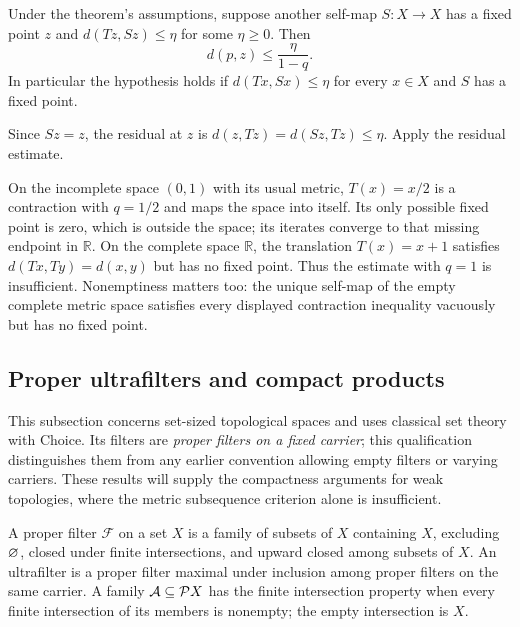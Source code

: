 \begin{corollary}
Under the theorem's assumptions, suppose another self-map $S:X\to X$
has a fixed point $z$ and $d(Tz,Sz)\leq\eta$ for some $\eta\geq0$.
Then
\[
d(p,z)\leq\frac{\eta}{1-q}.
\]
In particular the hypothesis holds if $d(Tx,Sx)\leq\eta$ for every
$x\in X$ and $S$ has a fixed point.
\end{corollary}
\Proof
Since $Sz=z$, the residual at $z$ is
$d(z,Tz)=d(Sz,Tz)\leq\eta$. Apply the residual estimate.
\Done

\begin{example}
On the incomplete space $(0,1)$ with its usual metric, $T(x)=x/2$
is a contraction with $q=1/2$ and maps the space into itself. Its
only possible fixed point is zero, which is outside the space; its
iterates converge to that missing endpoint in $\mathbb R$.
On the complete space $\mathbb R$, the translation $T(x)=x+1$
satisfies $d(Tx,Ty)=d(x,y)$ but has no fixed point. Thus the estimate
with $q=1$ is insufficient. Nonemptiness matters too: the unique
self-map of the empty complete metric space satisfies every displayed
contraction inequality vacuously but has no fixed point.
\end{example}

\subsection{Proper ultrafilters and compact products}
This subsection concerns set-sized topological spaces and uses classical
set theory with Choice. Its filters are \emph{proper filters on a fixed
carrier}; this qualification distinguishes them from any earlier convention
allowing empty filters or varying carriers. These results will supply the
compactness arguments for weak topologies, where the metric subsequence
criterion alone is insufficient.

\begin{definition}
A proper filter $\mathcal F$ on a set $X$ is a family of subsets of $X$
containing $X$, excluding $\varnothing$, closed under finite intersections,
and upward closed among subsets of $X$. An ultrafilter is a proper filter
maximal under inclusion among proper filters on the same carrier.
A family $\mathcal A\subseteq\mathcal{P} X$ has the finite intersection
property when every finite intersection of its members is nonempty;
the empty intersection is $X$.
\end{definition}

